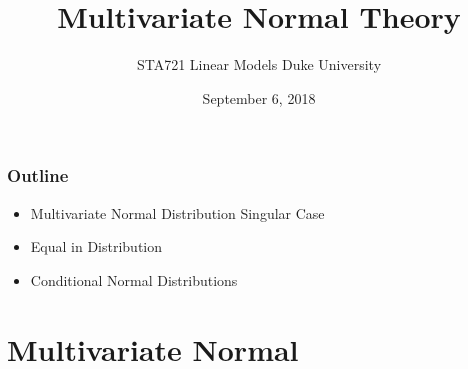 \documentclass[handout]{beamer}
\title{Multivariate Normal Theory}
\institute{Merlise Clyde}
\author{STA721 Linear Models Duke University}
\date{September 6, 2018}
\begin{document}
\maketitle

\begin{frame} \frametitle{Outline}

  \begin{itemize}

  \item Multivariate Normal Distribution Singular Case
  \item Equal in Distribution
  \item Conditional Normal Distributions

  \end{itemize}
\end{frame}


\section{Multivariate Normal}
\end{document}
